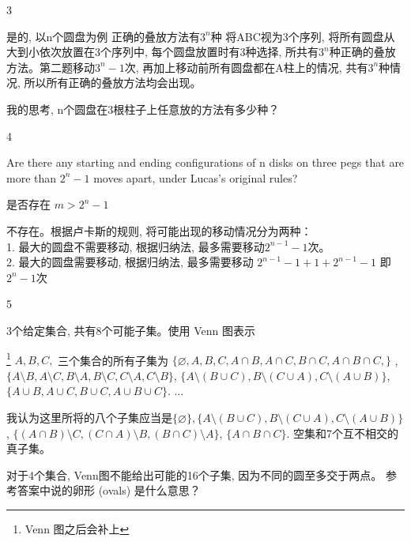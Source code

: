 \begin{exercise}3
\end{exercise}

\begin{answer}
	是的, 以n个圆盘为例
	正确的叠放方法有$ 3^n $种 将ABC视为3个序列, 将所有圆盘从大到小依次放置在3个序列中, 每个圆盘放置时有3种选择, 所共有$ 3^n $种正确的叠放方法。第二题移动$ 3^n-1 $次, 再加上移动前所有圆盘都在A柱上的情况, 共有$ 3^n $种情况, 所以所有正确的叠放方法均会出现。
	
	我的思考, n个圆盘在3根柱子上任意放的方法有多少种？
\end{answer}

\begin{exercise}4
\end{exercise}

\begin{answer}
	Are there any starting and ending configurations of n disks on three pegs
	that are more than $ 2^n - 1 $ moves apart, under Lucas's original rules?
	
	是否存在 $ m > 2^n-1 $
	
	不存在。根据卢卡斯的规则, 将可能出现的移动情况分为两种：\\		
	1. 最大的圆盘不需要移动, 根据归纳法, 最多需要移动$ 2^{n-1}-1 $次。\\	
	2. 最大的圆盘需要移动, 根据归纳法, 最多需要移动 $ 2^{n-1}-1 + 1 + 2^{n-1}-1 $ 即 $  2^{n}-1  $次
\end{answer}

\begin{exercise}5
\end{exercise}

\begin{answer}
	3个给定集合, 共有8个可能子集。使用 Venn 图表示
	
	\footnote{Venn 图之后会补上}
	$ A, B, C, $ 三个集合的所有子集为 $ \{\varnothing, A, B, C, A\cap B, A\cap C, B\cap C, A \cap B \cap C, \} $ , $\{A\setminus B, A\setminus C, B\setminus A, B\setminus C, C\setminus A, C\setminus B \}$, $ \{A\setminus (B\cup C), B\setminus (C\cup A), C\setminus (A\cup B)\} $, $ \{A\cup B, A\cup C, B\cup C, A\cup B\cup C\} $. $ \dots $
	
	我认为这里所将的八个子集应当是$ \{\varnothing\}, \{A\setminus (B\cup C), B\setminus (C\cup A), C\setminus (A\cup B)\} $, $ \{(A\cap B)\setminus C, (C\cap A)\setminus B, (B\cap C)\setminus A \} $, $ \{A\cap B\cap C\} $. 空集和7个互不相交的真子集。
	
	对于4个集合, Venn图不能给出可能的16个子集, 因为不同的圆至多交于两点。 参考答案中说的卵形 (ovals) 是什么意思？
\end{answer}

